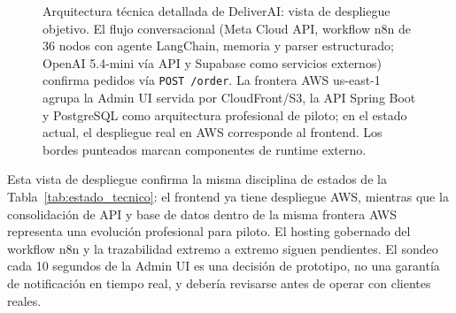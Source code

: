 \begin{figure}[htbp]
\begin{tikzpicture}
\end{tikzpicture}
\caption{Arquitectura técnica detallada de \mbox{DeliverAI}: vista de despliegue objetivo. El flujo conversacional (Meta Cloud API, workflow n8n de 36 nodos con agente LangChain, memoria y parser estructurado; OpenAI 5.4-mini vía API y Supabase como servicios externos) confirma pedidos vía \texttt{POST /order}. La frontera AWS us-east-1 agrupa la Admin UI servida por CloudFront/S3, la API Spring Boot y PostgreSQL como arquitectura profesional de piloto; en el estado actual, el despliegue real en AWS corresponde al frontend. Los bordes punteados marcan componentes de runtime externo.}%
\label{fig:arquitectura_detallada}
\end{figure}

Esta vista de despliegue confirma la misma disciplina de estados de la Tabla~\ref{tab:estado_tecnico}: el frontend ya tiene despliegue AWS, mientras que la consolidación de API y base de datos dentro de la misma frontera AWS representa una evolución profesional para piloto. El hosting gobernado del workflow n8n y la trazabilidad extremo a extremo siguen pendientes. El sondeo cada 10 segundos de la Admin UI es una decisión de prototipo, no una garantía de notificación en tiempo real, y debería revisarse antes de operar con clientes reales.

